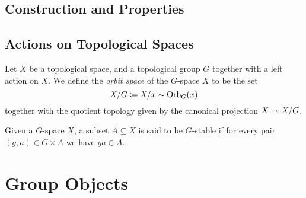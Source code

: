 \subsection{Construction and Properties}


\subsection{Actions on Topological Spaces}

\begin{definition}
    \label{def:orbit-space}
    Let \(X\) be a topological space, and a topological group \(G\) together with a
    left action on \(X\). We define the \emph{orbit space} of the \(G\)-space \(X\)
    to be the set
    \[
        X/G \coloneq X/{x \sim \operatorname{Orb}_G(x)}
    \]
    together with the quotient topology given by the canonical projection
    \(X \twoheadrightarrow X/G\).
\end{definition}

\begin{definition}[\(G\)-stable]
    \label{def:G-stable}
    Given a \(G\)-space \(X\), a subset \(A \subseteq X\) is said to be \(G\)-stable
    if for every pair \((g, a) \in G \times A\) we have \(g a \in A\).
\end{definition}

\section{Group Objects}


